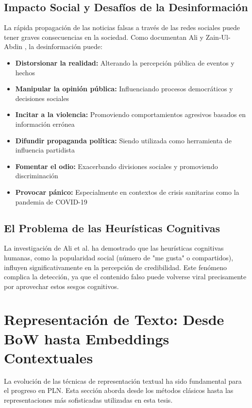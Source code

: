 \subsection{Impacto Social y Desafíos de la Desinformación}

La rápida propagación de las noticias falsas a través de las redes sociales puede tener graves consecuencias en la sociedad. Como documentan Ali y Zain-Ul-Abdin \cite{ali2020posttruth}, la desinformación puede:

\begin{itemize}
    \item \textbf{Distorsionar la realidad:} Alterando la percepción pública de eventos y hechos
    \item \textbf{Manipular la opinión pública:} Influenciando procesos democráticos y decisiones sociales
    \item \textbf{Incitar a la violencia:} Promoviendo comportamientos agresivos basados en información errónea
    \item \textbf{Difundir propaganda política:} Siendo utilizada como herramienta de influencia partidista
    \item \textbf{Fomentar el odio:} Exacerbando divisiones sociales y promoviendo discriminación
    \item \textbf{Provocar pánico:} Especialmente en contextos de crisis sanitarias como la pandemia de COVID-19 \cite{perez2020fake}
\end{itemize}

\subsection{El Problema de las Heurísticas Cognitivas}

La investigación de Ali et al. \cite{ali2021fake} ha demostrado que las heurísticas cognitivas humanas, como la popularidad social (número de "me gusta" o compartidos), influyen significativamente en la percepción de credibilidad. Este fenómeno complica la detección, ya que el contenido falso puede volverse viral precisamente por aprovechar estos sesgos cognitivos.

\section{Representación de Texto: Desde BoW hasta Embeddings Contextuales}
\label{sec:representacion_texto}

La evolución de las técnicas de representación textual ha sido fundamental para el progreso en PLN. Esta sección aborda desde los métodos clásicos hasta las representaciones más sofisticadas utilizadas en esta tesis.

